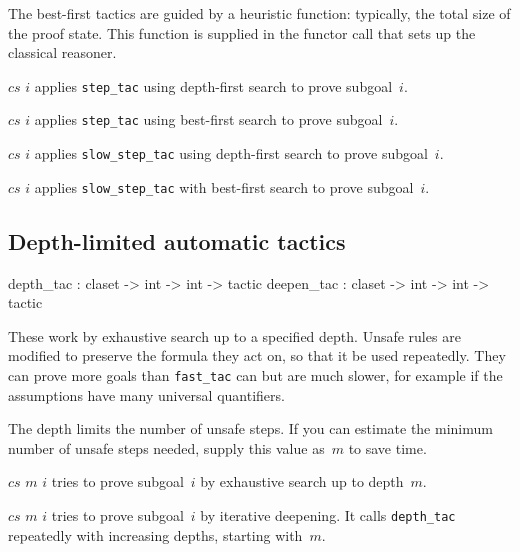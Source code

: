 The best-first tactics are guided by a heuristic function: typically, the
total size of the proof state.  This function is supplied in the functor call
that sets up the classical reasoner.
\begin{ttdescription}
\item[\ttindexbold{fast_tac} $cs$ $i$] applies \texttt{step_tac} using
depth-first search to prove subgoal~$i$.

\item[\ttindexbold{best_tac} $cs$ $i$] applies \texttt{step_tac} using
best-first search to prove subgoal~$i$.

\item[\ttindexbold{slow_tac} $cs$ $i$] applies \texttt{slow_step_tac} using
depth-first search to prove subgoal~$i$.

\item[\ttindexbold{slow_best_tac} $cs$ $i$] applies \texttt{slow_step_tac} with
best-first search to prove subgoal~$i$.
\end{ttdescription}


\subsection{Depth-limited automatic tactics}
\begin{ttbox} 
depth_tac  : claset -> int -> int -> tactic
deepen_tac : claset -> int -> int -> tactic
\end{ttbox}
These work by exhaustive search up to a specified depth.  Unsafe rules are
modified to preserve the formula they act on, so that it be used repeatedly.
They can prove more goals than \texttt{fast_tac} can but are much
slower, for example if the assumptions have many universal quantifiers.

The depth limits the number of unsafe steps.  If you can estimate the minimum
number of unsafe steps needed, supply this value as~$m$ to save time.
\begin{ttdescription}
\item[\ttindexbold{depth_tac} $cs$ $m$ $i$] 
tries to prove subgoal~$i$ by exhaustive search up to depth~$m$.

\item[\ttindexbold{deepen_tac} $cs$ $m$ $i$] 
tries to prove subgoal~$i$ by iterative deepening.  It calls \texttt{depth_tac}
repeatedly with increasing depths, starting with~$m$.
\end{ttdescription}


